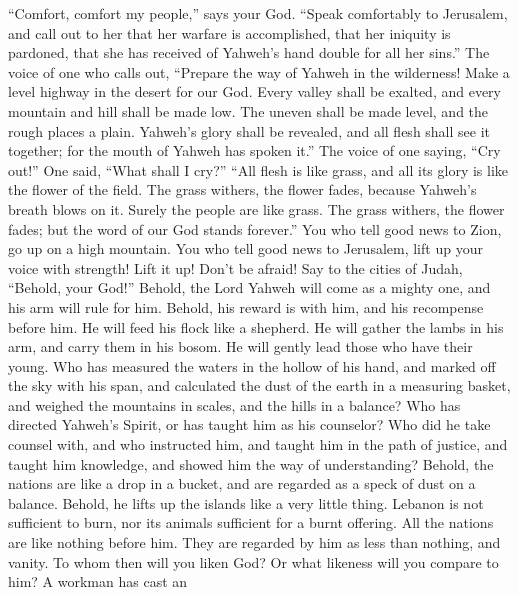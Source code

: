  ``Comfort, comfort my people,'' says your God.
 ``Speak comfortably to Jerusalem, and call out to her
that her warfare is accomplished, that her iniquity is pardoned, that
she has received of Yahweh's hand double for all her sins.''
 The voice of one who calls out, ``Prepare the way of
Yahweh in the wilderness! Make a level highway in the desert for our
God.  Every valley shall be exalted, and every mountain
and hill shall be made low. The uneven shall be made level, and the
rough places a plain.  Yahweh's glory shall be revealed,
and all flesh shall see it together; for the mouth of Yahweh has spoken
it.''  The voice of one saying, ``Cry out!'' One said,
``What shall I cry?'' ``All flesh is like grass, and all its glory is
like the flower of the field.  The grass withers, the
flower fades, because Yahweh's breath blows on it. Surely the people are
like grass.  The grass withers, the flower fades; but the
word of our God stands forever.''  You who tell good news
to Zion, go up on a high mountain. You who tell good news to Jerusalem,
lift up your voice with strength! Lift it up! Don't be afraid! Say to
the cities of Judah, ``Behold, your God!''  Behold, the
Lord Yahweh will come as a mighty one, and his arm will rule for him.
Behold, his reward is with him, and his recompense before him.
 He will feed his flock like a shepherd. He will gather
the lambs in his arm, and carry them in his bosom. He will gently lead
those who have their young.  Who has measured the waters
in the hollow of his hand, and marked off the sky with his span, and
calculated the dust of the earth in a measuring basket, and weighed the
mountains in scales, and the hills in a balance?  Who has
directed Yahweh's Spirit, or has taught him as his counselor?
 Who did he take counsel with, and who instructed him,
and taught him in the path of justice, and taught him knowledge, and
showed him the way of understanding?  Behold, the nations
are like a drop in a bucket, and are regarded as a speck of dust on a
balance. Behold, he lifts up the islands like a very little thing.
 Lebanon is not sufficient to burn, nor its animals
sufficient for a burnt offering.  All the nations are
like nothing before him. They are regarded by him as less than nothing,
and vanity.  To whom then will you liken God? Or what
likeness will you compare to him?  A workman has cast an
